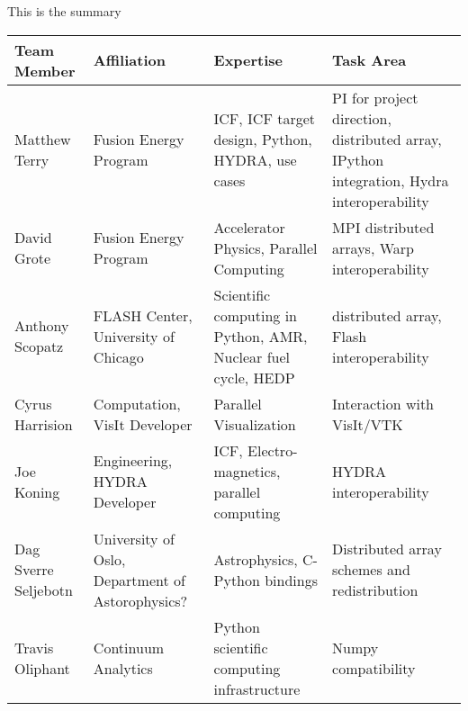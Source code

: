 \documentclass[a4paper]{article}
\newlength{\DUtablewidth} %
\begin{document}
This is the summary


\setlength{\DUtablewidth}{\linewidth}
\begin{longtable*}[c]{|p{0.187\DUtablewidth}|p{0.251\DUtablewidth}|p{0.260\DUtablewidth}|p{0.251\DUtablewidth}|}
	\hline
	\textbf{Team Member} & \textbf{Affiliation} & \textbf{Expertise} & \textbf{Task Area} \\
	\hline
	\endfirsthead
	\hline

	Matthew Terry &
	Fusion Energy Program &
	ICF, ICF target design, Python, HYDRA, use cases &
	PI for project direction, distributed array, IPython integration, Hydra interoperability \\
	\hline

	David Grote &
	Fusion Energy Program &
	Accelerator Physics, Parallel Computing &
	MPI distributed arrays, Warp interoperability \\
	\hline

	Anthony Scopatz &
	FLASH Center, University of Chicago &
	Scientific computing in Python, AMR, Nuclear fuel cycle, HEDP &
	distributed array, Flash interoperability \\
	\hline

	Cyrus Harrision &
	Computation, VisIt Developer &
	Parallel Visualization &
	Interaction with VisIt/VTK  \\
	\hline

	Joe Koning &
	Engineering, HYDRA Developer & 
	ICF, Electro-magnetics, parallel computing & 
	HYDRA interoperability \\
	\hline

	Dag Sverre Seljebotn &
	University of Oslo, Department of Astorophysics? & 
	Astrophysics, C-Python bindings &
	Distributed array schemes and redistribution \\
	\hline

	Travis Oliphant &
	Continuum Analytics &
	Python scientific computing infrastructure &
	Numpy compatibility \\

	\hline
\end{longtable*}



\end{document}
